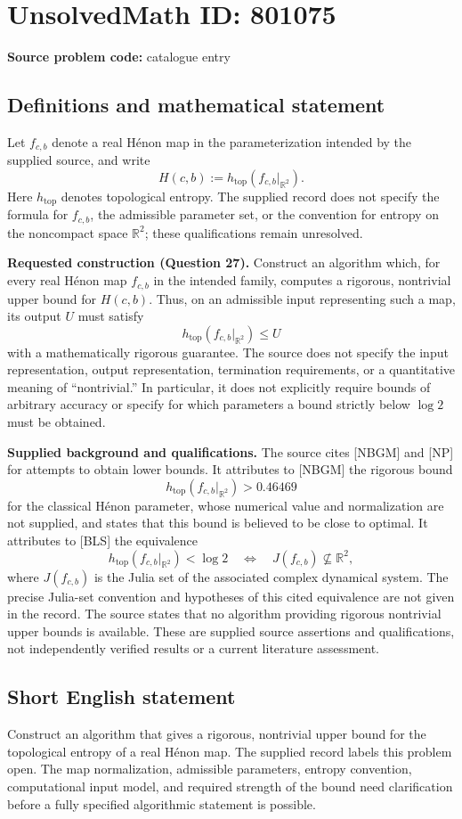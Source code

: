 \documentclass[11pt]{article}
\newcommand{\R}{\mathbb{R}}
\begin{document}
\section*{UnsolvedMath ID: 801075}
\textbf{Source problem code:} catalogue entry
\subsection{Definitions and mathematical statement}
Let \(f_{c,b}\) denote a real H\'enon map in the parameterization intended by the supplied source, and write
\[
H(c,b):=h_{\mathrm{top}}\!\left(f_{c,b}|_{\R^2}\right).
\]
Here \(h_{\mathrm{top}}\) denotes topological entropy. The supplied record does not specify the formula for \(f_{c,b}\), the admissible parameter set, or the convention for entropy on the noncompact space \(\R^2\); these qualifications remain unresolved.

\textbf{Requested construction (Question 27).} Construct an algorithm which, for every real H\'enon map \(f_{c,b}\) in the intended family, computes a rigorous, nontrivial upper bound for \(H(c,b)\). Thus, on an admissible input representing such a map, its output \(U\) must satisfy
\[
h_{\mathrm{top}}\!\left(f_{c,b}|_{\R^2}\right)\leq U
\]
with a mathematically rigorous guarantee. The source does not specify the input representation, output representation, termination requirements, or a quantitative meaning of ``nontrivial.'' In particular, it does not explicitly require bounds of arbitrary accuracy or specify for which parameters a bound strictly below \(\log 2\) must be obtained.

\textbf{Supplied background and qualifications.} The source cites [NBGM] and [NP] for attempts to obtain lower bounds. It attributes to [NBGM] the rigorous bound
\[
h_{\mathrm{top}}\!\left(f_{c,b}|_{\R^2}\right)>0.46469
\]
for the classical H\'enon parameter, whose numerical value and normalization are not supplied, and states that this bound is believed to be close to optimal. It attributes to [BLS] the equivalence
\[
h_{\mathrm{top}}\!\left(f_{c,b}|_{\R^2}\right)<\log 2
\quad\Longleftrightarrow\quad
J(f_{c,b})\not\subseteq\R^2,
\]
where \(J(f_{c,b})\) is the Julia set of the associated complex dynamical system. The precise Julia-set convention and hypotheses of this cited equivalence are not given in the record. The source states that no algorithm providing rigorous nontrivial upper bounds is available. These are supplied source assertions and qualifications, not independently verified results or a current literature assessment.
\subsection{Short English statement}
Construct an algorithm that gives a rigorous, nontrivial upper bound for the topological entropy of a real H\'enon map. The supplied record labels this problem open. The map normalization, admissible parameters, entropy convention, computational input model, and required strength of the bound need clarification before a fully specified algorithmic statement is possible.
\end{document}
